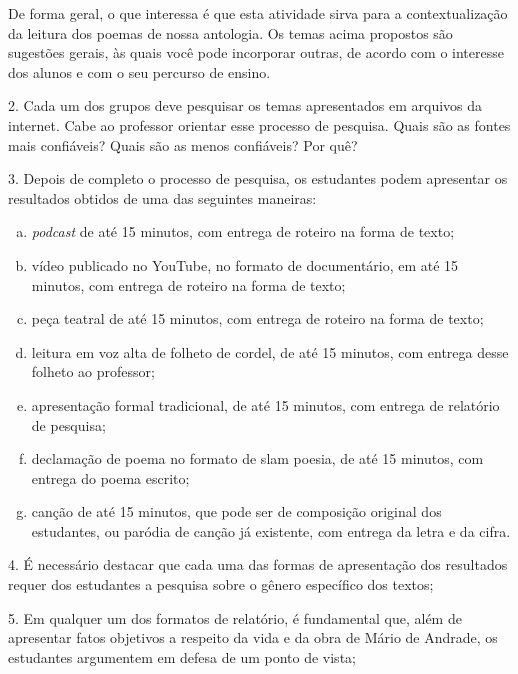 \documentclass[11pt]{extarticle}
\begin{document}
De forma geral, o que interessa é que esta atividade sirva para a
contextualização da leitura dos poemas de nossa antologia. Os temas
acima propostos são sugestões gerais, às quais você pode incorporar
outras, de acordo com o interesse dos alunos e com o seu percurso de
ensino.

2. Cada um dos grupos deve pesquisar os temas apresentados em arquivos
da internet. Cabe ao professor orientar esse processo de pesquisa. Quais
são as fontes mais confiáveis? Quais são as menos confiáveis? Por quê?

3. Depois de completo o processo de pesquisa, os estudantes podem
apresentar os resultados obtidos de uma das seguintes maneiras:

\begin{enumerate}[(a)]

\item \textit{podcast} de até 15 minutos, com entrega de roteiro na forma de texto;

\item vídeo publicado no YouTube, no formato de documentário, em até 15
minutos, com entrega de roteiro na forma de texto;

\item peça teatral de até 15 minutos, com entrega de roteiro na forma de
texto;

\item leitura em voz alta de folheto de cordel, de até 15 minutos, com
entrega desse folheto ao professor;

\item apresentação formal tradicional, de até 15 minutos, com entrega de
relatório de pesquisa;

\item declamação de poema no formato de slam poesia, de até 15 minutos, com
entrega do poema escrito;

\item canção de até 15 minutos, que pode ser de composição original dos
estudantes, ou paródia de canção já existente, com entrega da letra e da
cifra.
\end{enumerate} 

4. É necessário destacar que cada uma das formas de apresentação dos
resultados requer dos estudantes a pesquisa sobre o gênero específico
dos textos;

5. Em qualquer um dos formatos de relatório, é fundamental que, além de
apresentar fatos objetivos a respeito da vida e da obra de Mário de
Andrade, os estudantes argumentem em defesa de um ponto de vista;
\end{document}
